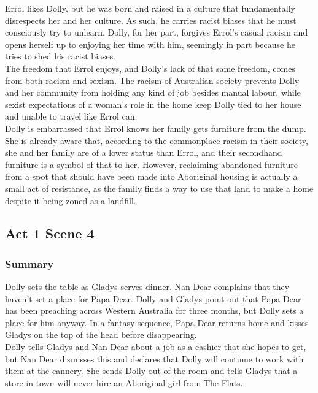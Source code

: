 \documentclass[a4paper]{article}
\begin{document}
Errol likes Dolly, but he was born and raised in a culture that
fundamentally disrespects her and her culture. As such, he carries
racist biases that he must consciously try to unlearn. Dolly, for her
part, forgives Errol’s casual racism and opens herself up to enjoying
her time with him, seemingly in part because he tries to shed his
racist biases.\\

The freedom that Errol enjoys, and Dolly’s lack of that same
freedom, comes from both racism and sexism. The racism of
Australian society prevents Dolly and her community from holding
any kind of job besides manual labour, while sexist expectations of a
woman’s role in the home keep Dolly tied to her house and unable
to travel like Errol can.\\

Dolly is embarrassed that Errol knows her family gets furniture from
the dump. She is already aware that, according to the commonplace
racism in their society, she and her family are of a lower status than
Errol, and their secondhand furniture is a symbol of that to her.
However, reclaiming abandoned furniture from a spot that should
have been made into Aboriginal housing is actually a small act of
resistance, as the family finds a way to use that land to make a
home despite it being zoned as a landfill.\\

\subsection{Act 1 Scene 4}
\subsubsection{Summary}
Dolly sets the table as Gladys serves dinner. Nan Dear
complains that they haven’t set a place for Papa Dear. Dolly and
Gladys point out that Papa Dear has been preaching across
Western Australia for three months, but Dolly sets a place for
him anyway. In a fantasy sequence, Papa Dear returns home
and kisses Gladys on the top of the head before disappearing.\\

Dolly tells Gladys and Nan Dear about a job as a cashier that
she hopes to get, but Nan Dear dismisses this and declares that
Dolly will continue to work with them at the cannery. She sends
Dolly out of the room and tells Gladys that a store in town will
never hire an Aboriginal girl from The Flats.\\
\end{document}

